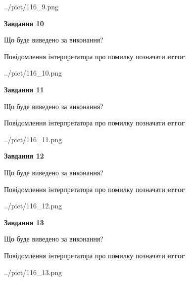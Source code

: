 \documentclass[11pt, ukrainian]{article}
\begin{document}
{\begin {large}
\begin{center}
	{../pict/116_9.png}
\end{center}
\newpage

{\begin {center}\textbf{Завдання 10}\end {center}}\par
Що буде виведено за виконання? \par
Повідомлення інтерпретатора про помилку позначати \textbf{error}

\begin{center}
	{../pict/116_10.png}
\end{center}
\newpage

{\begin {center}\textbf{Завдання 11}\end {center}}\par
Що буде виведено за виконання? \par
Повідомлення інтерпретатора про помилку позначати \textbf{error}

\begin{center}
	{../pict/116_11.png}
\end{center}
\newpage

{\begin {center}\textbf{Завдання 12}\end {center}}\par
Що буде виведено за виконання? \par
Повідомлення інтерпретатора про помилку позначати \textbf{error}

\begin{center}
	{../pict/116_12.png}
\end{center}
\newpage

{\begin {center}\textbf{Завдання 13}\end {center}}\par
Що буде виведено за виконання? \par
Повідомлення інтерпретатора про помилку позначати \textbf{error}

\begin{center}
	{../pict/116_13.png}
\end{center}
\newpage


\end{large}}
\end{document}
